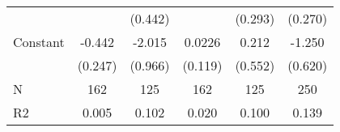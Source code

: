 {\begin{tabular}{l*{5}{c}}
                    &                     &     (0.442)         &                     &     (0.293)         &     (0.270)         \\
[1em]
Constant            &      -0.442\sym{*}  &      -2.015\sym{**} &      0.0226         &       0.212         &      -1.250\sym{**} \\
                    &     (0.247)         &     (0.966)         &     (0.119)         &     (0.552)         &     (0.620)         \\
\hline
N                   &         162         &         125         &         162         &         125         &         250         \\
R2                  &       0.005         &       0.102         &       0.020         &       0.100         &       0.139         \\
\hline\hline
\end{tabular}
}
